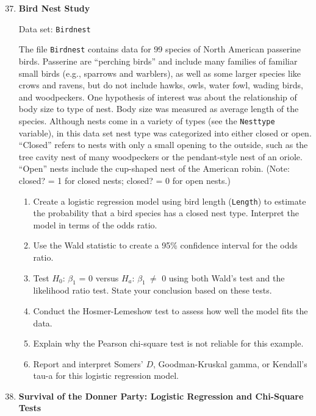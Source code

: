 \documentclass[
]{report}
\begin{document}
\begin{enumerate}
  \setcounter{enumi}{36}

  \item \textbf{Bird Nest Study}

Data set: \texttt{Birdnest}

The file \texttt{Birdnest} contains data for 99 species of North American passerine birds. Passerine are “perching birds” and include many families of familiar small birds (e.g., sparrows and warblers), as well as some larger species like crows and ravens, but do not include hawks, owls, water fowl, wading birds, and woodpeckers. One hypothesis of interest was about the relationship of body size to type of nest. Body size was measured as average length of the species. Although nests come in a variety of types (see the \texttt{Nesttype} variable), in this data set nest type was categorized into either closed or open. “Closed” refers to nests with only a small opening to the outside, such as the tree cavity nest of many woodpeckers or the pendant-style nest of an oriole. “Open” nests include the cup-shaped nest of the American robin. (Note: closed? = 1 for closed nests; closed? = 0 for open nests.)

  \begin{enumerate}
    \item Create a logistic regression model using bird length (\texttt{Length}) to estimate the probability that a bird species has a closed nest type. Interpret the model in terms of the odds ratio.
    \item Use the Wald statistic to create a 95\% confidence interval for the odds ratio.
    \item Test $\scriptstyle H_0$: $\scriptstyle \beta_1$ = 0 versus $\scriptstyle H_a$: $\scriptstyle \beta_1  \ \ne$ 0 using both Wald’s test and the likelihood ratio test. State your conclusion based on these tests.
    \item Conduct the Hosmer-Lemeshow test to assess how well the model fits the data.
    \item Explain why the Pearson chi-square test is not reliable for this example.
    \item Report and interpret Somers’ $\scriptstyle D$, Goodman-Kruskal gamma, or Kendall’s tau-a for this logistic regression model.
  \end{enumerate}

  \item \textbf{Survival of the Donner Party: Logistic Regression and Chi-Square Tests}


\end{enumerate}
\end{document}
